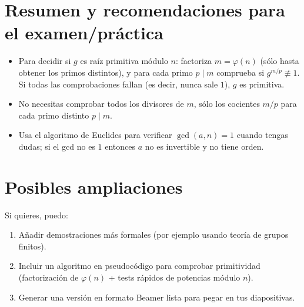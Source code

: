 \documentclass[12pt]{article}
\begin{document}
\section{Resumen y recomendaciones para el examen/práctica}
\begin{itemize}[noitemsep]
\item Para decidir si $g$ es raíz primitiva módulo $n$: factoriza $m=\varphi(n)$ (sólo hasta obtener los primos distintos), y para cada primo $p\mid m$ comprueba si $g^{m/p}\not\equiv1$. Si todas las comprobaciones fallan (es decir, nunca sale $1$), $g$ es primitiva.
\item No necesitas comprobar todos los divisores de $m$, sólo los cocientes $m/p$ para cada primo distinto $p\mid m$.
\item Usa el algoritmo de Euclides para verificar $\gcd(a,n)=1$ cuando tengas dudas; si el gcd no es $1$ entonces $a$ no es invertible y no tiene orden.
\end{itemize}

\section{Posibles ampliaciones}
Si quieres, puedo:
\begin{enumerate}
\item Añadir demostraciones más formales (por ejemplo usando teoría de grupos finitos).
\item Incluir un algoritmo en pseudocódigo para comprobar primitividad (factorización de $\varphi(n)$ + tests rápidos de potencias módulo $n$).
\item Generar una versión en formato Beamer lista para pegar en tus diapositivas.
\end{enumerate}
\end{document}
